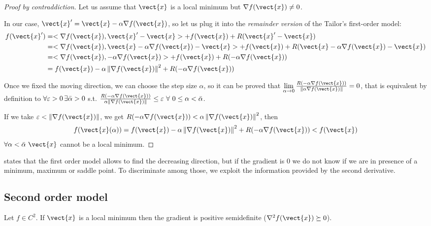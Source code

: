 \documentclass[computationalMathematics.tex]{subfiles}
\begin{document}
\begin{proof}[Proof by contraddiction]
  Let us assume that $\vect{x}$ is a local minimum but $\nabla f(\vect{x}) \neq 0$.
  
  In our case, $\vect{x}' = \vect{x} -\alpha \nabla f(\vect{x})$, so let us plug it into the \emph{remainder version} of the Tailor's first-order model:
  \[
  \begin{split}
  	f(\vect{x}') &= \ps{\nabla f(\vect{x})}{\vect{x}' - \vect{x}} + f(\vect{x}) + R(\vect{x}' - \vect{x})\\
  	&= \ps{\nabla f(\vect{x})}{\vect{x} - \alpha \nabla f(\vect{x}) - \vect{x}} + f(\vect{x}) + R(\vect{x} - \alpha \nabla f(\vect{x}) - \vect{x})\\
  	&= \ps{\nabla f(\vect{x})}{- \alpha \nabla f(\vect{x})} + f(\vect{x}) + R(- \alpha \nabla f(\vect{x}))\\
  	&= f(\vect{x}) - \alpha \norm{\nabla f(\vect{x})}^2 + R(- \alpha \nabla f(\vect{x}))
  \end{split}
  \]
   
	Once we fixed the moving direction, we can choose the step size $\alpha$, so it can be proved that $\lim\limits_{\alpha \to 0} \frac{R(- \alpha \nabla f(\vect{x}))}{\norm{\alpha \nabla f(\vect{x})}} = 0$, that is equivalent by definition to $\forall \varepsilon > 0 \, \exists \bar{\alpha} > 0$ s.t. $\frac{R(- \alpha \nabla f(\vect{x}))}{\alpha \norm{\nabla f(\vect{x})}} \leq \eps~\forall ~ 0 \leq \alpha < \bar{\alpha}$.

 	If we take $\eps < \norm{\nabla f(\vect{x})}$, we get  $R(- \alpha \nabla f(\vect{x})) < \alpha \norm{\nabla f(\vect{x})}^2$, then 
	\[
	  f(\vect{x}(\alpha)) = f(\vect{x}) - \alpha \norm{\nabla f(\vect{x})}^2 + R(- \alpha \nabla f(\vect{x})) < f(\vect{x})
	\]
	$\forall \alpha < \bar{\alpha}~\vect{x}$ cannot be a local minimum.
\end{proof}

 states that the first order model allows to find the decreasing direction, but if the gradient is $0$ we do not know if we are in presence of a minimum, maximum or saddle point.
To discriminate among those, we exploit the information provided by the second derivative.

\subsection{Second order model}

\begin{proposition}
Let $f \in C^2$. If $\vect{x}$ is a local minimum then the gradient is positive semidefinite ($\nabla^2 f(\vect{x}) \succeq 0$).
\end{proposition}
\end{document}
